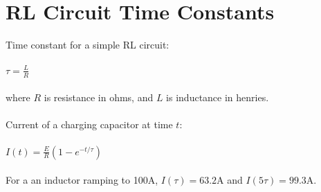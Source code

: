 \documentclass[10pt]{article}
\begin{document}
\section*{RL Circuit Time Constants}
Time constant for a simple RL circuit:\\\\
$\tau = \frac{L}{R}$\\\\
where $R$ is resistance in ohms, and $L$ is inductance in henries.\\\\
Current of a charging capacitor at time $t$:\\\\
$I(t) = \frac{E}{R}(1-e^{-t/\tau})$\\\\
For a an inductor ramping to 100A, $I(\tau) = 63.2$A and $I(5\tau) = 99.3$A.
\end{document}
